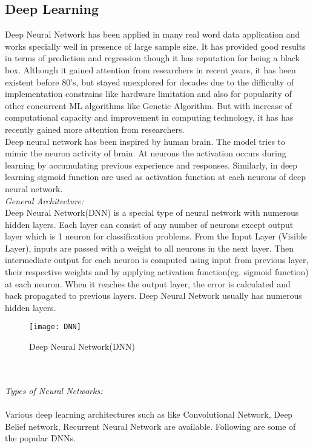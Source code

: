 \documentclass[conference]{IEEEtran}
\begin{document}
\subsection{Deep Learning}
Deep Neural Network has been applied in many real word data application and works specially well in presence of large sample size. It has provided good results in terms of prediction and regression though it has reputation for being a black box. Although it gained attention from researchers in recent years, it has been existent before 80’s, but stayed unexplored for decades due to the difficulty of implementation constrains like  hardware limitation and also for popularity of other concurrent ML algorithms like Genetic Algorithm. But with increase of computational capacity and improvement in computing technology, it has has recently gained more attention from researchers.\\
Deep neural network has been inspired by human brain. The model tries to mimic the neuron activity of brain. At neurons the activation occurs  during learning by accumulating previous experience and responses. Similarly, in deep learning sigmoid function are used as activation function at each neurons of deep neural network.\\
\emph{General Architecture:}\\
Deep Neural Network(DNN) is a special type of neural network with numerous hidden layers. Each layer can consist of any number of neurons except output layer which is 1 neuron for classification problems. From the Input Layer (Visible Layer), inputs are passed with a weight to all neurons in the next layer. Then intermediate output for each neuron is computed using input from previous layer, their respective weights and by applying activation function(eg. sigmoid function) at each neuron. When it reaches the output layer, the error is calculated and back propagated to previous layers. Deep Neural Network usually has  numerous hidden layers.
\begin{figure}[h]
\begin{center}
\texttt{[image: DNN]}
\end{center}
\caption{Deep Neural Network(DNN)}
\end{figure}\\\\
\emph{Types of Neural Networks:}\\\\
Various deep learning architectures such as like Convolutional Network, Deep Belief network, Recurrent Neural Network are available. Following are some of the popular DNNs.\\
\end{document}
